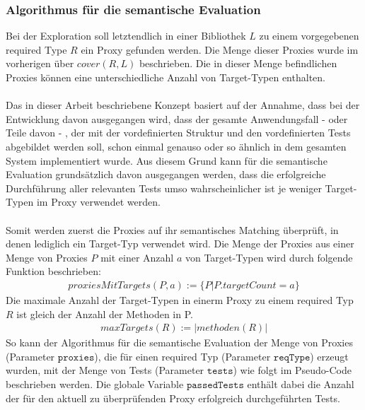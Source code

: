 \documentclass[a4paper,12pt]{article}
\begin{document}
\subsubsection{Algorithmus für die semantische Evaluation}
Bei der Exploration soll letztendlich in einer Bibliothek $L$ zu einem vorgegebenen required Type $R$ ein Proxy gefunden werden. Die Menge dieser Proxies wurde im vorherigen über $\mathit{cover(R,L)}$ beschrieben. Die in dieser Menge befindlichen Proxies können eine unterschiedliche Anzahl von Target-Typen enthalten.\\\\
Das in dieser Arbeit beschriebene Konzept basiert auf der Annahme, dass bei der Entwicklung davon ausgegangen wird, dass der gesamte Anwendungsfall - oder Teile davon - , der mit der vordefinierten Struktur und den vordefinierten Tests abgebildet werden soll, schon einmal genauso oder so ähnlich in dem gesamten System implementiert wurde. Aus diesem Grund kann für die semantische Evaluation grundsätzlich davon ausgegangen werden, dass die erfolgreiche Durchführung aller relevanten Tests umso wahrscheinlicher ist je weniger Target-Typen im Proxy verwendet werden.\\\\
Somit werden zuerst die Proxies auf ihr semantisches Matching überprüft, in denen lediglich ein Target-Typ verwendet wird. Die Menge der Proxies aus einer Menge von Proxies $P$ mit einer Anzahl $a$ von Target-Typen wird durch folgende Funktion beschrieben:
\begin{gather*}
proxiesMitTargets(P,a) := \{P | P.targetCount = a\}
\end{gather*}
Die maximale Anzahl der Target-Typen in einerm Proxy zu einem required Typ $R$ ist gleich der Anzahl der Methoden in P.
\begin{gather*}
maxTargets(R) := |\mathit{methoden(R)}|
\end{gather*}
\noindent
So kann der Algorithmus für die semantische Evaluation der Menge von Proxies (Parameter $\texttt{proxies}$), die für einen required Typ (Parameter $\texttt{reqType}$) erzeugt wurden, mit der Menge von Tests (Parameter $\texttt{tests}$) wie folgt im Pseudo-Code beschrieben werden. Die globale Variable $\texttt{passedTests}$ enthält dabei die Anzahl der für den aktuell zu überprüfenden Proxy erfolgreich durchgeführten Tests.
\end{document}
